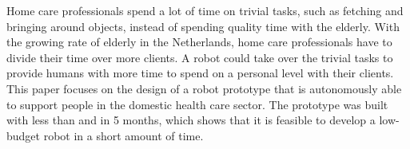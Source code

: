 \documentclass[project_eva.tex]{subfiles}
\begin{document}
Home care professionals spend a lot of time on trivial tasks, such as fetching and bringing around objects, instead of spending quality time with the elderly. With the growing rate of elderly in the Netherlands\cite{CBS}, home care professionals have to divide their time over more clients. A robot could take over the trivial tasks to provide humans with more time to spend on a personal level with their clients.
This paper focuses on the design of a robot prototype that is autonomously able to support people in the domestic health care sector.  The prototype was built with less than  and in 5 months, which shows that it is feasible to develop a low-budget robot in a short amount of time.
\end{document}
